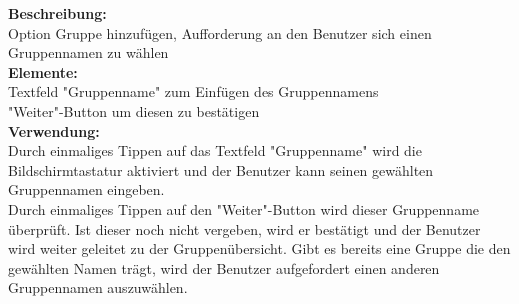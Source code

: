\textbf{Beschreibung:}\\
Option Gruppe hinzufügen, Aufforderung an den Benutzer sich einen Gruppennamen zu wählen\\
\textbf{Elemente:}\\
Textfeld "Gruppenname" zum Einfügen des Gruppennamens\\
"Weiter"-Button um diesen zu bestätigen\\
\textbf{Verwendung:}\\
Durch einmaliges Tippen auf das Textfeld "Gruppenname" wird die Bildschirmtastatur aktiviert und der Benutzer kann seinen gewählten Gruppennamen eingeben.\\
Durch einmaliges Tippen auf den "Weiter"-Button wird dieser Gruppenname überprüft. Ist dieser noch nicht vergeben, wird er bestätigt und der Benutzer wird weiter geleitet zu der Gruppenübersicht. Gibt es bereits eine Gruppe die den gewählten Namen trägt, wird der Benutzer aufgefordert einen anderen Gruppennamen auszuwählen.
\newpage

